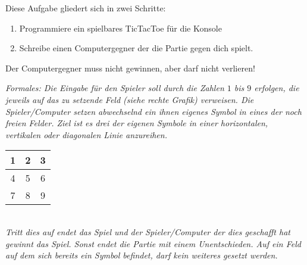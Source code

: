 \documentclass[table]{sopra-base}
\begin{document}
Diese Aufgabe gliedert sich in zwei Schritte: \begin{enumerate}[nolistsep]
    \item Programmiere ein spielbares TicTacToe für die Konsole
    \item Schreibe einen Computergegner der die Partie gegen dich spielt.
\end{enumerate}
Der Computergegner muss nicht gewinnen, aber darf nicht verlieren!\smallskip\\
\begin{minipage}{0.8\linewidth}
    \textit{Formales: Die Eingabe für den Spieler soll durch die Zahlen $1$ bis $9$ erfolgen, die jeweils auf das zu setzende Feld (siehe rechte Grafik) verweisen. Die Spieler/Computer setzen abwechselnd ein ihnen eigenes Symbol in eines der noch freien Felder. Ziel ist es drei der eigenen Symbole in einer horizontalen, vertikalen oder diagonalen Linie anzureihen.}
\end{minipage}\begin{minipage}{0.2\linewidth}
    \centering\begin{tabular}{c|c|c}
        1 & 2 & 3 \\\hline
        4 & 5 & 6 \\\hline
        7 & 8 & 9
    \end{tabular}
\end{minipage}\bigskip\\
\textit{Tritt dies auf endet das Spiel und der Spieler/Computer der dies geschafft hat gewinnt das Spiel. Sonst endet die Partie mit einem Unentschieden. Auf ein Feld auf dem sich bereits ein Symbol befindet, darf kein weiteres gesetzt werden.}
\end{document}
